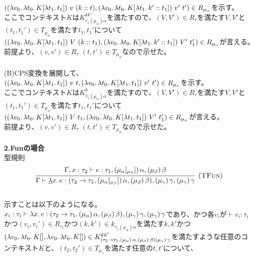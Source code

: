 $(\LamP{v_0}{\Lam{t_0}{K[\Lam{t_1}{t_1}]}}\ v\ \ConsP{k}{t}, \LamP{v_0}{\Lam{t_0}{K[\Lam{t_1}{\Cons{k'}{t_1}}]}}\ v'\ t')\in R_{\mu_{\alpha}}$を示す。\\
ここでコンテキスト$K$は$K^{kk'}_{\tau_1(\mu_{\alpha})\alpha}$を満たすので、$(V,V')\in R_{\tau}$を満たす$V,V'$と$(t_1, t_1')\in T_{\mu_{\alpha}}$を満たす$t_1, t_1'$について\\
$(\LamP{v_0}{\Lam{t_0}{K[\Lam{t_1}{t_1}]}}\ V\ \ConsP{k}{t_1}, \LamP{v_0}{\Lam{t_0}{K[\Lam{t_1}{\Cons{k'}{t_1}}]}}\ V'\ t_1')\in R_{\mu_{\alpha}}$が言える。\\
前提より、$(v,v')\in R_{\tau}$ $(t, t') \in T_{\mu_{\alpha}}$なので示せた。\\
\\
(B)CPS変換を展開して、\\
$(\LamP{v_0}{\Lam{t_0}{K[\Lam{t_1}{t_1}]}}\ v\ t, \LamP{v_0}{\Lam{t_0}{K[\Lam{t_1}{t_1}]}}\ v'\ t')\in R_{\mu_{\alpha}}$を示す。\\
ここでコンテキスト$K$は$K^k_{\tau_1(\mu_{\alpha})\alpha}$を満たすので、$(V,V')\in R_{\tau}$を満たす$V,V'$と$(t_1, t_1')\in T_{\mu_{\alpha}}$を満たす$t_1, t_1'$について\\
$(\LamP{v_0}{\Lam{t_0}{K[\Lam{t_1}{t_1}]}}\ V\ t_1, \LamP{v_0}{\Lam{t_0}{K[\Lam{t_1}{t_1}]}}\ V'\ t_1')\in R_{\mu_{\alpha}}$が言える。\\
前提より、$(v,v')\in R_{\tau}$ $(t, t') \in T_{\mu_{\alpha}}$なので示せた。\\
\\
\textbf{2.Funの場合}\\
型規則
\[
\begin{array}{c}
\infer[\TFun]
      {\JudgeTrail{\Gamma}{\DLam{x}{e}}
                  {\ArrowTrailP{\tau_2}{\tau_1}
                               {\TrailsType{\alpha}{\beta}}
                               {\TrailType{\beta}}}
                  {\TrailType{\gamma}}
                  {\TrailType{\gamma}}}
      {\JudgeTrail{\Gamma,x:\tau_2}{e}{\tau_1}
                  {\TrailsType{\alpha}{\beta}}
                  {\TrailType{\beta}}}
\end{array}
\]
\\
示すことは以下のようになる。\\
$x_i:\tau_i \vdash \lambda{x}.\,{e}:(\tau_2\rightarrow{\tau_1},(\mu_{\alpha})\,\alpha,(\mu_{\beta})\,\beta), (\mu_{\gamma})\,\gamma, (\mu_{\gamma})\,\gamma$であり、かつ各$v_i$が$\vdash v_i:\tau_i$かつ$(v_i,v_i') \in R_{\tau_i}$かつ$(k,k')\in k_{\tau_1(\mu_{\alpha})\alpha}$を満たす$k,k'$かつ$(\lambda{v_0}.\,{\lambda{t_0}.\,{K[]}}, \lambda{v_0}.\,{\lambda{t_0}.\,{K[]}})\in  K^{kk'}_{(\tau_2\rightarrow{\tau_1},(\mu_{\alpha})\,\alpha,(\mu_{\beta})\,\beta) (\mu_{\gamma})\,\gamma}$を満たすような任意のコンテキスト$K$と、$(t_2, t_2') \in T_{\mu_{\gamma}}$を満たす任意の$t, t'$について、\\
